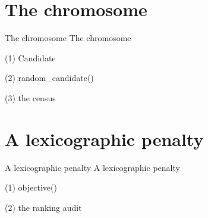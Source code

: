 \section{The chromosome}

\begin{frame}{The chromosome}
The chromosome
\end{frame}

\begin{frame}[fragile]{(1) Candidate}

\end{frame}

\begin{frame}[fragile]{(2) random\_candidate()}

\end{frame}

\begin{frame}[fragile]{(3) the census}

\end{frame}


\section{A lexicographic penalty}

\begin{frame}{A lexicographic penalty}
A lexicographic penalty
\end{frame}

\begin{frame}[fragile]{(1) objective()}

\end{frame}

\begin{frame}[fragile]{(2) the ranking audit}

\end{frame}

